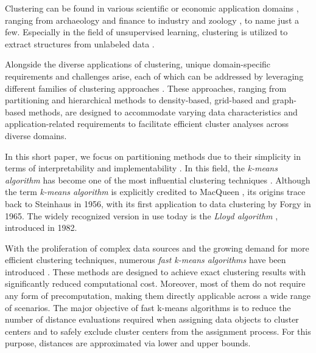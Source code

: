 Clustering can be found in various scientific or economic application domains \cite{ezugwu2022comprehensive,oyewole2023data, gan2020data}, ranging from archaeology \cite{troiano2024comparative} and finance \cite{cai2016clustering} to industry \cite{lee2021technological} and zoology \cite{shen2021multivariate}, to name just a few. Especially in the field of unsupervised learning, clustering is utilized to extract structures from unlabeled data \cite{chander2023data}.

Alongside the diverse applications of clustering, unique domain-specific requirements and challenges arise, each of which can be addressed by leveraging different families of clustering approaches \cite{xu2015comprehensive,han2012data}. These approaches, ranging from partitioning and hierarchical methods to density-based, grid-based and graph-based methods, are designed to accommodate varying data characteristics and application-related requirements to facilitate efficient cluster analyses across diverse domains.


In this short paper, we focus on partitioning methods due to their simplicity in terms of interpretability and implementability \cite{DBLP:conf/iiwas/BeecksBHLSD22}. In this field, the \emph{k-means algorithm} \cite{bock2007clustering,hans2008origins,DBLP:journals/prl/Jain10,steinley2006k} has become one of the most influential clustering techniques \cite{DBLP:journals/kais/WuKQGYMMNLYZSHS08,olukanmi2019rethinking}. Although the term \emph{k-means algorithm} is explicitly credited to MacQueen \cite{macqueen1967}, its origins trace back to Steinhaus \cite{steinhaus1956division} in 1956, with its first application to data clustering by Forgy \cite{forgy1965cluster} in 1965. The widely recognized version in use today is the \emph{Lloyd algorithm} \cite{DBLP:journals/tit/Lloyd82}, introduced in 1982.

With the proliferation of complex data sources and the growing demand for more efficient clustering techniques, numerous \emph{fast k-means algorithms} have been introduced \cite{DBLP:conf/icml/Elkan03,DBLP:conf/sdm/Hamerly10,drake2012accelerated,hamerly2015accelerating,DBLP:conf/icml/NewlingF16,DBLP:conf/icml/DingZSMM15,DBLP:conf/sisap/SchubertLF21,DBLP:conf/sisap/LangS23}. These methods are designed to achieve exact clustering results with significantly reduced computational cost. Moreover, most of them do not require any form of precomputation, making them directly applicable across a wide range of scenarios. The major objective of fast k-means algorithms is to reduce the number of distance evaluations required when assigning data objects to cluster centers and to safely exclude cluster centers from the assignment process. For this purpose, distances are approximated via lower and upper bounds.

